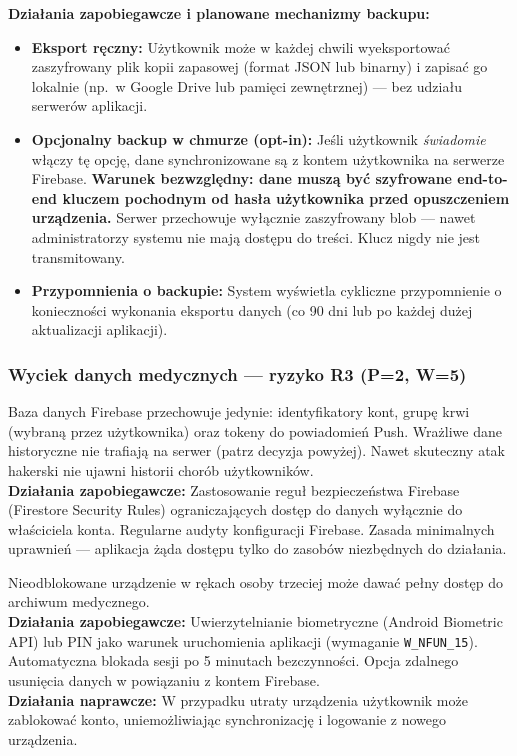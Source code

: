 \documentclass[11pt, a4paper]{article}
\newcommand{\req}[1]{\texttt{#1}}
\newcommand{\term}[1]{\textbf{#1}}
\begin{document}
\textbf{Działania zapobiegawcze i planowane mechanizmy backupu:}
\begin{itemize}
  \item \textbf{Eksport ręczny:} Użytkownik może w każdej chwili wyeksportować zaszyfrowany plik kopii zapasowej (format JSON lub binarny) i zapisać go lokalnie (np.\ w Google Drive lub pamięci zewnętrznej) — bez udziału serwerów aplikacji.
  \item \textbf{Opcjonalny backup w chmurze (opt-in):} Jeśli użytkownik \emph{świadomie} włączy tę opcję, dane synchronizowane są z kontem użytkownika na serwerze Firebase. \textbf{Warunek bezwzględny: dane muszą być szyfrowane end-to-end kluczem pochodnym od hasła użytkownika przed opuszczeniem urządzenia.} Serwer przechowuje wyłącznie zaszyfrowany blob — nawet administratorzy systemu nie mają dostępu do treści. Klucz nigdy nie jest transmitowany.
  \item \textbf{Przypomnienia o backupie:} System wyświetla cykliczne przypomnienie o konieczności wykonania eksportu danych (co 90 dni lub po każdej dużej aktualizacji aplikacji).
\end{itemize}

\subsubsection*{Wyciek danych medycznych — ryzyko R3 (P=2, W=5)}

\begin{description}[leftmargin=0pt]
    \item[\term{Atak na infrastrukturę chmurową:}]
    Baza danych Firebase przechowuje jedynie: identyfikatory kont, grupę krwi (wybraną przez użytkownika) oraz tokeny do powiadomień Push. Wrażliwe dane historyczne nie trafiają na serwer (patrz decyzja powyżej). Nawet skuteczny atak hakerski nie ujawni historii chorób użytkowników. \\
    \textbf{Działania zapobiegawcze:} Zastosowanie reguł bezpieczeństwa Firebase (Firestore Security Rules) ograniczających dostęp do danych wyłącznie do właściciela konta. Regularne audyty konfiguracji Firebase. Zasada minimalnych uprawnień — aplikacja żąda dostępu tylko do zasobów niezbędnych do działania.

    \item[\term{Kradzież i zgubienie telefonu — ryzyko R4 (P=2, W=4):}]
    Nieodblokowane urządzenie w rękach osoby trzeciej może dawać pełny dostęp do archiwum medycznego. \\
    \textbf{Działania zapobiegawcze:} Uwierzytelnianie biometryczne (Android Biometric API) lub PIN jako warunek uruchomienia aplikacji (wymaganie \req{W\_NFUN\_15}). Automatyczna blokada sesji po 5 minutach bezczynności. Opcja zdalnego usunięcia danych w powiązaniu z kontem Firebase. \\
    \textbf{Działania naprawcze:} W przypadku utraty urządzenia użytkownik może zablokować konto, uniemożliwiając synchronizację i logowanie z nowego urządzenia.
\end{description}
\end{document}
